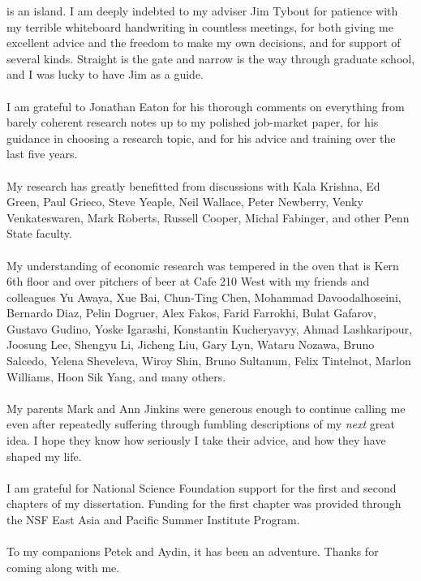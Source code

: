 
 is an island.  I am deeply indebted to my adviser Jim Tybout for patience with my terrible whiteboard handwriting in countless meetings, for both giving me excellent advice and the freedom to make my own decisions, and for support of several kinds.  Straight is the gate and narrow is the way through graduate school, and I was lucky to have Jim as a guide.\\
\vspace{1pt} \\
I am grateful to Jonathan Eaton for his thorough comments on everything from barely coherent research notes up to my polished job-market paper, for his guidance in choosing a research topic, and for his advice and training over the last five years.\\
\vspace{1pt}\\
My research has greatly benefitted from discussions with Kala Krishna, Ed Green, Paul Grieco, Steve Yeaple, Neil Wallace, Peter Newberry, Venky Venkateswaren, Mark Roberts, Russell Cooper, Michal Fabinger, and other Penn State faculty.\\
\vspace{1pt}\\
My understanding of economic research was tempered in the oven that is Kern 6th floor and over pitchers of beer at Cafe 210 West with my friends and colleagues Yu Awaya, Xue Bai, Chun-Ting Chen, Mohammad Davoodalhoseini, Bernardo Diaz, Pelin Dogruer, Alex Fakos, Farid Farrokhi, Bulat Gafarov, Gustavo Gudino, Yoske Igarashi, Konstantin Kucheryavyy, Ahmad Lashkaripour, Joosung Lee, Shengyu Li, Jicheng Liu, Gary Lyn, Wataru Nozawa, Bruno Salcedo, Yelena Sheveleva, Wiroy Shin, Bruno Sultanum, Felix Tintelnot, Marlon Williams, Hoon Sik Yang, and many others.\\
\vspace{1pt}\\
My parents Mark and Ann Jinkins were generous enough to continue calling me even after repeatedly suffering through fumbling descriptions of my \emph{next} great idea.  I hope they know how seriously I take their advice, and how they have shaped my life.\\
\vspace{1pt}\\
I am grateful for National Science Foundation support for the first and second chapters of my dissertation.  Funding for the first chapter was provided through the NSF East Asia and Pacific Summer Institute Program.\\
\vspace{1pt}\\
To my companions Petek and Aydin, it has been an adventure.  Thanks for coming along with me.
